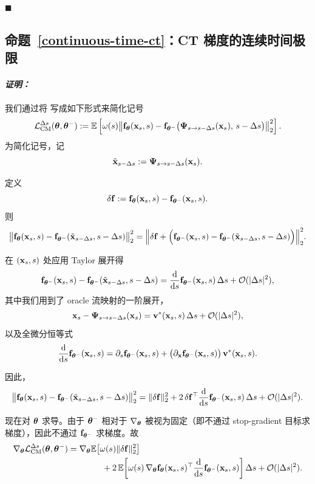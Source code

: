 \hfill$\blacksquare$


\subsection{命题~\ref{continuous-time-ct}：CT 梯度的连续时间极限}

\paragraph{\textit{证明：}}

我们通过将  写成如下形式来简化记号
\begin{align*}
\mathcal{L}_{\mathrm{CM}}^{\Delta s}({\bm{\theta}},{\bm{\theta}}^-)
:=
\mathbb{E} \left[\omega(s)\big\|
{\mathbf{f}}_{{\bm{\theta}}}({\mathbf{x}}_s,s) -
{\mathbf{f}}_{{\bm{\theta}}^-}\big({\bm{\Psi}}_{s\to s-\Delta s}({\mathbf{x}}_s),\, s-\Delta s\big)
\big\|_2^2\right].
\end{align*}
为简化记号，记
\[
\tilde{{\mathbf{x}}}_{s-\Delta s}:={\bm{\Psi}}_{s\to s-\Delta s}({\mathbf{x}}_s).
\]

定义
\[
\delta {\mathbf{f}}
:= {\mathbf{f}}_{{\bm{\theta}}}({\mathbf{x}}_s,s)-{\mathbf{f}}_{{\bm{\theta}}^-}({\mathbf{x}}_s,s).
\]
则
\begin{align*}
\big\|{\mathbf{f}}_{{\bm{\theta}}}({\mathbf{x}}_s, s)- {\mathbf{f}}_{{\bm{\theta}}^-}(\tilde{{\mathbf{x}}}_{s-\Delta s}, s-\Delta s)\big\|_2^2
=
\Big\|\delta {\mathbf{f}}
+
\Big({\mathbf{f}}_{{\bm{\theta}}^-}({\mathbf{x}}_s, s)-{\mathbf{f}}_{{\bm{\theta}}^-}(\tilde{{\mathbf{x}}}_{s-\Delta s}, s-\Delta s)\Big)\Big\|_2^2.
\end{align*}

在 $({\mathbf{x}}_s,s)$ 处应用 Taylor 展开得
\begin{align*}
{\mathbf{f}}_{{\bm{\theta}}^-}({\mathbf{x}}_s,s) -
{\mathbf{f}}_{{\bm{\theta}}^-}(\tilde{{\mathbf{x}}}_{s-\Delta s}, s-\Delta s)
=
\frac{\mathop{}\!\mathrm{d}}{\mathop{}\!\mathrm{d} s}{\mathbf{f}}_{{\bm{\theta}}^-}({\mathbf{x}}_s,s)\,\Delta s
+ \mathcal{O}(|\Delta s|^2),
\end{align*}
其中我们用到了 oracle 流映射的一阶展开，
\[
{\mathbf{x}}_s - {\bm{\Psi}}_{s\to s-\Delta s}({\mathbf{x}}_s)
= {\mathbf{v}}^*({\mathbf{x}}_s,s)\,\Delta s + \mathcal{O}(|\Delta s|^2),
\]
以及全微分恒等式
\[
\frac{\mathop{}\!\mathrm{d}}{\mathop{}\!\mathrm{d} s}{\mathbf{f}}_{{\bm{\theta}}^-}({\mathbf{x}}_s,s)
=
\partial_s {\mathbf{f}}_{{\bm{\theta}}^-}({\mathbf{x}}_s,s)
+
\big(\partial_{{\mathbf{x}}}{\mathbf{f}}_{{\bm{\theta}}^-}({\mathbf{x}}_s,s)\big)\,{\mathbf{v}}^*({\mathbf{x}}_s,s).
\]

因此，
\begin{align*}
\big\|{\mathbf{f}}_{{\bm{\theta}}}({\mathbf{x}}_s, s)- {\mathbf{f}}_{{\bm{\theta}}^-}(\tilde{{\mathbf{x}}}_{s-\Delta s}, s-\Delta s)\big\|_2^2
=
\|\delta {\mathbf{f}}\|_2^2
+
2\,\delta {\mathbf{f}}^\top \frac{\mathop{}\!\mathrm{d}}{\mathop{}\!\mathrm{d} s}{\mathbf{f}}_{{\bm{\theta}}^-}({\mathbf{x}}_s,s)\,\Delta s
+
\mathcal{O}(|\Delta s|^2).
\end{align*}

现在对 ${\bm{\theta}}$ 求导。由于 ${\bm{\theta}}^-$ 相对于 $\nabla_{{\bm{\theta}}}$ 被视为固定（即不通过 stop-gradient 目标求梯度），因此不通过 ${\mathbf{f}}_{{\bm{\theta}}^-}$ 求梯度。故
\begin{align*}
\nabla_{{\bm{\theta}}}\mathcal{L}_{\mathrm{CM}}^{\Delta s}({\bm{\theta}},{\bm{\theta}}^-)
&=
\nabla_{{\bm{\theta}}}\mathbb{E}\!\left[\omega(s)\|\delta {\mathbf{f}}\|_2^2\right]\\
&\qquad\qquad
+
2\,\mathbb{E}\!\left[
\omega(s)\,
\nabla_{{\bm{\theta}}}{\mathbf{f}}_{{\bm{\theta}}}({\mathbf{x}}_s,s)^\top
\frac{\mathop{}\!\mathrm{d}}{\mathop{}\!\mathrm{d} s}{\mathbf{f}}_{{\bm{\theta}}^-}({\mathbf{x}}_s,s)
\right]\Delta s
+
\mathcal{O}(|\Delta s|^2).
\end{align*}

